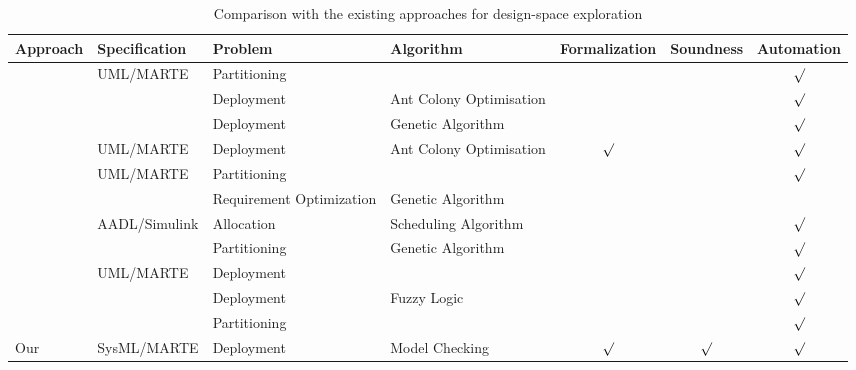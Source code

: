 \documentclass[3p,times,procedia,authoryear,round]{elsarticle}
\begin{document}
\begin{table}
	\begin{center}
		
		\begin{tabular}{ l l m{2cm} l   l l l}
			
			\hline
			Approach &  Specification & Problem &  Algorithm & Formalization & Soundness & Automation \\ 
			\hline
	
		\cite{Herrera201455} & UML/MARTE & Partitioning & & & &\multicolumn{1}{c}{$\surd$} \\
	
		\cite{Thiruvady20141937} &  & Deployment & Ant Colony Optimisation & & &\multicolumn{1}{c}{$\surd$} \\
		
		\cite{Meedeniya2011835} &  & Deployment & Genetic Algorithm & & &\multicolumn{1}{c}{$\surd$} \\
		
		\cite{Nascimento2012}  & UML/MARTE & Deployment & Ant Colony Optimisation & \multicolumn{1}{c}{$\surd$}  & &\multicolumn{1}{c}{$\surd$}\\				
		
		
		\cite{Brosse2012}	& UML/MARTE& Partitioning &  & & &\multicolumn{1}{c}{$\surd$}\\	
		
		
		\cite{MartinezAlvarez20136813}	&  & Requirement Optimization & Genetic Algorithm & & &\\	
		
		\cite{Besnard201554}& AADL/Simulink  & Allocation & Scheduling Algorithm  & & &\multicolumn{1}{c}{$\surd$}\\	
		
		
		\cite{Nath201430}&  & Partitioning & Genetic Algorithm & & &\multicolumn{1}{c}{$\surd$}\\	
					
		\cite{Posadas20141281}& UML/MARTE & Deployment &   & & & \multicolumn{1}{c}{$\surd$}\\
	
    	\cite{Qadri2016}&   & Deployment & Fuzzy Logic   & & & \multicolumn{1}{c}{$\surd$}\\
	\cite{Jia2014}&  & Partitioning &   & & & \multicolumn{1}{c}{$\surd$}\\
    
		Our & SysML/MARTE & Deployment & Model Checking &\multicolumn{1}{c}{$\surd$} & \multicolumn{1}{c}{$\surd$} &\multicolumn{1}{c}{$\surd$} \\
		\hline			
			
		\end{tabular}
		\normalsize
	\end{center}
	\caption{Comparison with the existing approaches for design-space exploration}
	\label{table1}
\end{table}
\end{document}
